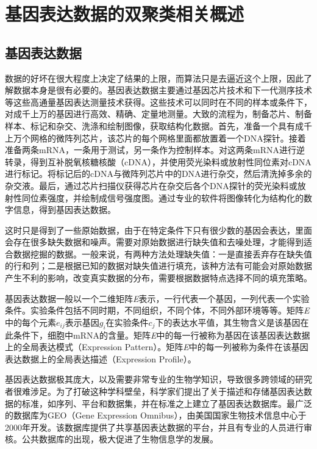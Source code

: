 \chapter{基因表达数据的双聚类相关概述}

\section{基因表达数据}
  数据的好坏在很大程度上决定了结果的上限，而算法只是去逼近这个上限，因此了解数据本身是很有必要的。基因表达数据主要通过基因芯片技术和下一代测序技术等这些高通量基因表达测量技术获得。这些技术可以同时在不同的样本或条件下，对成千上万的基因进行高效、精确、定量地测量。大致的流程为，制备芯片、制备样本、标记和杂交、洗涤和绘制图像，获取结构化数据。首先，准备一个具有成千上万个网格的微阵列芯片，该芯片的每个网格里面都放置着一个DNA探针。接着准备两条mRNA，一条用于测试，另一条作为控制样本。对这两条mRNA进行逆转录，得到互补脱氧核糖核酸（cDNA），并使用荧光染料或放射性同位素对cDNA进行标记。将标记后的cDNA与微阵列芯片中的DNA进行杂交，然后清洗掉多余的杂交液。最后，通过芯片扫描仪获得芯片在杂交后各个DNA探针的荧光染料或放射性同位素强度，并绘制成信号强度图。通过专业的软件将图像转化为结构化的数字信息，得到基因表达数据。
  
  这时只是得到了一些原始数据，由于在特定条件下只有很少数的基因会表达，里面会存在很多缺失数据和噪声。需要对原始数据进行缺失值和去噪处理，才能得到适合数据挖掘的数据。一般来说，有两种方法处理缺失值：一是直接丢弃存在缺失值的行和列；二是根据已知的数据对缺失值进行填充，该种方法有可能会对原始数据产生不利的影响，改变真实数据的分布，需要根据数据特点选择不同的填充策略。

  基因表达数据一般以一个二维矩阵\textit{E}表示，一行代表一个基因，一列代表一个实验条件。实验条件包括不同时期，不同组织，不同个体，不同外部环境等等。矩阵\textit{E}中的每个元素$e_{ij} $表示基因$g_i$在实验条件$c_j$下的表达水平值，其生物含义是该基因在此条件下，细胞中mRNA的含量。矩阵\textit{E}中的每一行被称为基因在该基因表达数据上的全局表达模式（Expression Pattern）。矩阵\textit{E}中的每一列被称为条件在该基因表达数据上的全局表达描述（Expression Profile）。

  基因表达数据极其庞大，以及需要非常专业的生物学知识，导致很多跨领域的研究者很难涉足。为了打破这种学科壁垒，科学家们提出了关于描述和存储基因表达数据的标准，如序列、平台和数据集，并在标准之上建立了基因表达数据库。最广泛的数据库为GEO（Gene Expression Omnibus），由美国国家生物技术信息中心于2000年开发。该数据库提供了共享基因表达数据的平台，并且有专业的人员进行审核。公共数据库的出现，极大促进了生物信息学的发展。
